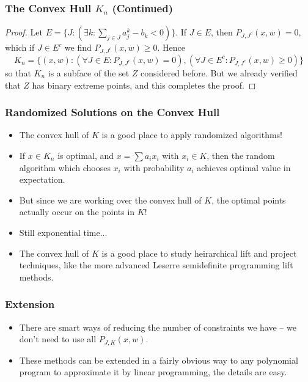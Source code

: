 \documentclass{beamer}
\begin{document}
\begin{frame}
    \frametitle{The Convex Hull $K_n$ (Continued)}

    \begin{proof}
        Let $E = \{ J : (\exists k : \sum_{j \in J} a_j^k - b_k < 0) \}$. If $J \in E$, then $P_{J,J^c}(x,w) = 0$, which if $J \in E^c$ we find $P_{J,J^c}(x,w) \geq 0$. Hence
        \[ K_n = \{ (x,w): (\forall J \in E: P_{J,J^c}(x,w) = 0), (\forall J \in E^c: P_{J,J^c}(x,w) \geq 0) \} \]
        so that $K_n$ is a subface of the set $Z$ considered before. But we already verified that $Z$ has binary extreme points, and this completes the proof.
    \end{proof}
\end{frame}

\begin{frame}
    \frametitle{Randomized Solutions on the Convex Hull}

    \begin{itemize}
        \item The convex hull of $K$ is a good place to apply randomized algorithms!
        \item If $x \in K_n$ is optimal, and $x = \sum a_ix_i$ with $x_i \in K$, then the random algorithm which chooses $x_i$ with probability $a_i$ achieves optimal value in expectation.
        \item But since we are working over the convex hull of $K$, the optimal points actually occur on the points in $K$!
        \item Still exponential time...
        \item The convex hull of $K$ is a good place to study heirarchical lift and project techniques, like the more advanced Leserre semidefinite programming lift methods.
    \end{itemize}
\end{frame}

\begin{frame}
    \frametitle{Extension}

    \begin{itemize}
        \item There are smart ways of reducing the number of constraints we have -- we don't need to use all $P_{J,K}(x,w)$.
        \item These methods can be extended in a fairly obvious way to any polynomial program to approximate it by linear programming, the details are easy.
    \end{itemize}
\end{frame}
\end{document}
